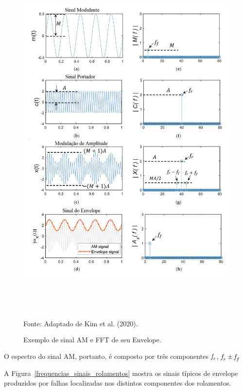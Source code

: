 \documentclass[
	12pt,				
	oneside,			
	a4paper,			
	english,			
	brazil,	
	sumario=abnt-6027-2012		
	]{abntex2ppgsi}
\newcommand{\f}{\mkern-2mu f\mkern-3mu}
\begin{document}
\begin{figure}[!htb]
\centering
\caption {Exemplo de sinal AM e FFT de seu Envelope.}
\includegraphics[width=\textwidth,height=190mm,keepaspectratio]{exemplo_AM_FFT} \\
Fonte: Adaptado de Kim et al. (2020).
\label{exemplo_AM_FFT}
\end{figure}

O espectro do sinal AM, portanto, é composto por três componentes ${\f}_r$, ${\f}_r \pm {\f}_f$ 

A Figura~\ref{frequencias_sinais_rolamentos} mostra os sinais típicos de envelope produzidos por falhas localizadas nos distintos componentes dos rolamentos. 
\end{document}
